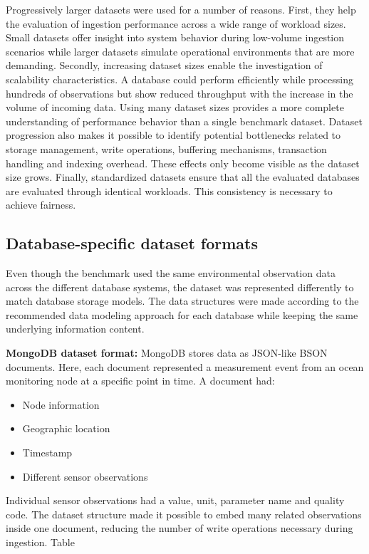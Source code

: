 Progressively larger datasets were used for a number of reasons. First, they help the evaluation of ingestion performance across a wide range of workload sizes. Small datasets offer insight into system behavior during low-volume ingestion scenarios while larger datasets simulate operational environments that are more demanding. Secondly, increasing dataset sizes enable the investigation of scalability characteristics. A database could perform efficiently while processing hundreds of observations but show reduced throughput with the increase in the volume of incoming data. Using many dataset sizes provides a more complete understanding of performance behavior than a single benchmark dataset. Dataset progression also makes it possible to identify potential bottlenecks related to storage management, write operations, buffering mechanisms, transaction handling and indexing overhead. These effects only become visible as the dataset size grows. Finally, standardized datasets ensure that all the evaluated databases are evaluated through identical workloads. This consistency is necessary to achieve fairness.



\subsection{Database-specific dataset formats}
Even though the benchmark used the same environmental observation data across the different database systems, the dataset was represented differently to match database storage models. The data structures were made according to the recommended data modeling approach for each database while keeping the same underlying information content. 

\textbf{MongoDB dataset format:}
MongoDB stores data as JSON-like BSON documents. Here, each document represented a measurement event from an ocean monitoring node at a specific point in time. A document had:
\begin{itemize}
    \item Node information
    \item Geographic location
    \item Timestamp
    \item Different sensor observations
\end{itemize}

Individual sensor observations had a value, unit, parameter name and quality code. The dataset structure made it possible to embed many related observations inside one document, reducing the number of write operations necessary during ingestion. Table 

